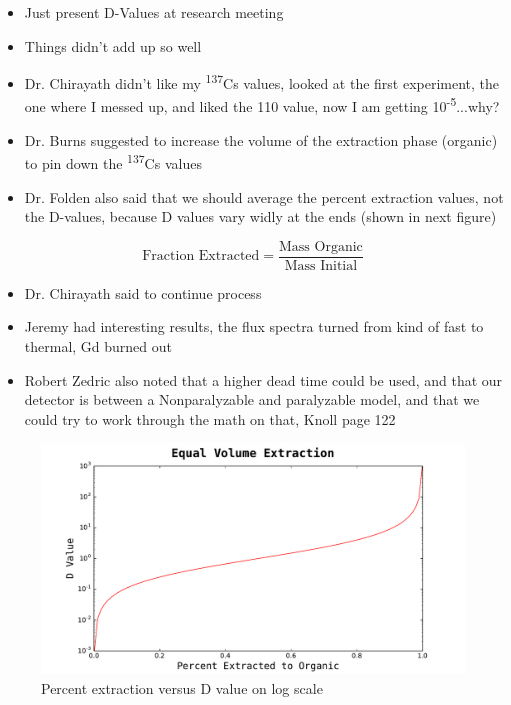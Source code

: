 \documentclass[idxtotoc,hyperref,openany,oneside]{labbook} %
\newcommand{\tss}{\textsuperscript}
\begin{document}

\begin{itemize}
\item{Just present D-Values at research meeting}
\item{Things didn't add up so well}
\item{Dr. Chirayath didn't like my \tss{137}Cs values,
  looked at the first experiment, the one where
  I messed up, and liked the 110 value, now I
  am getting 10\tss{-5}...why?}
\item{Dr. Burns suggested to increase the volume
  of the extraction phase (organic) to pin
  down the \tss{137}Cs values}
\item{Dr. Folden also said that we should average
  the percent extraction values, not the D-values,
  because D values vary widly at the ends (shown in
  next figure)}
\end{itemize}
\begin{equation*}
  \text{Fraction Extracted}=\frac{\text{Mass Organic}}{\text{Mass Initial}}
\end{equation*}
\begin{itemize}
\item{Dr. Chirayath said to continue process}
\item{Jeremy had interesting results, the flux spectra
  turned from kind of fast to thermal, Gd burned out}
\item{Robert Zedric also noted that a higher dead time
  could be used, and that our detector is between
  a Nonparalyzable and paralyzable model, and that
  we could try to work through the math on that,
  Knoll page 122}
\end{itemize}

\begin{figure}[H] %
\begin{center}
  \includegraphics[width=0.8\linewidth]
                  {Figures/Percent_Extraction_vs_D_Value_log}
\end{center}
\caption{Percent extraction versus D value on log scale}
\label{fig:P_Ext}
\end{figure}
\end{document}
